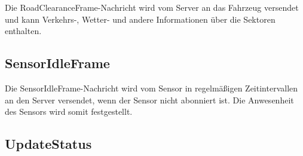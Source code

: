 Die RoadClearanceFrame-Nachricht wird vom Server an das Fahrzeug versendet und kann Verkehrs-, Wetter- und andere Informationen über die Sektoren enthalten.

\subsection{SensorIdleFrame}

Die SensorIdleFrame-Nachricht wird vom Sensor in regelmäßigen Zeitintervallen an den Server versendet, wenn der Sensor nicht abonniert ist.
Die Anwesenheit des Sensors wird somit festgestellt.

\subsection{UpdateStatus}



%		
%		
%		


